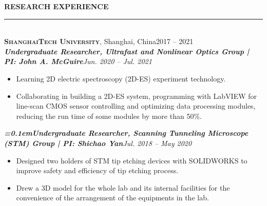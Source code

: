 \documentclass[letterpaper,11pt]{article}
\begin{document}
{\Large\bfseries{}RESEARCH EXPERIENCE}\\
\rule[1.5ex]{\columnwidth}{1pt}
\vspace{-4ex}\\
{\large\bfseries\scshape{}ShanghaiTech University}, Shanghai, China\hfill{2017 -- 2021}\\
{\bfseries\itshape{}Undergraduate Researcher, Ultrafast and Nonlinear Optics Group | PI: John A. McGuire}\hfill{\itshape{}Jun. 2020 -- Jul. 2021}\\
\vspace{-4ex}
\begin{itemize}
    \item Learning 2D electric spectroscopy (2D-ES) experiment technology.
    \item Collaborating in building a 2D-ES system, programming with LabVIEW for line-scan CMOS sensor controlling and optimizing data processing modules, reducing the run time of some modules by more than 50\%.
\end{itemize}
\vspace{-1ex}
{\bfseries\itshape{}\font=0.1em{}Undergraduate Researcher, Scanning Tunneling Microscope (STM) Group | PI: Shichao Yan}\hfill{\itshape{}Jul. 2018 -- May 2020}\\
\vspace{-4ex}
\begin{itemize}
    \item Designed two holders of STM tip etching devices with SOLIDWORKS to improve safety and efficiency of tip etching process.
    \item Drew a 3D model for the whole lab and its internal facilities for the convenience of the arrangement of the equipments in the lab.
\end{itemize}
\vspace{-2ex}%
\end{document}

